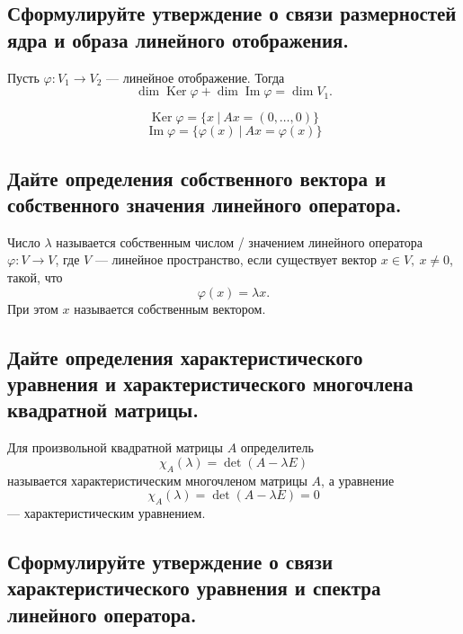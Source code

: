 \subsection{Сформулируйте утверждение о связи размерностей ядра и образа линейного отображения.}

\begin{theorem}
    Пусть $\varphi: V_1 \to V_2$ --- линейное отображение. Тогда
    \[
        \dim \operatorname{Ker}\varphi + \dim \operatorname{Im}\varphi = \dim V_1.
    \]
\end{theorem}

\begin{remark}
    \[
        \operatorname{Ker}\varphi =
        \{x\ |\ Ax = (0, \ldots, 0)\}
    \]
    \[
        \operatorname{Im}\varphi =
        \{\varphi(x)\ |\ Ax = \varphi(x)\}
    \]
\end{remark}

\subsection{Дайте определения собственного вектора и собственного значения линейного оператора.}

\begin{definition}
    Число $\lambda$ называется собственным числом / значением линейного оператора
    $\varphi: V \to V$, где $V$ --- линейное пространство, если существует вектор
    $x \in V,\ x \neq 0$, такой, что
    \[
        \varphi(x) = \lambda x.
    \]
    При этом $x$ называется собственным вектором.
\end{definition}

\subsection{Дайте определения характеристического уравнения и характеристического многочлена квадратной матрицы.}

\begin{definition}
    Для произвольной квадратной матрицы $A$ определитель
    \[
        \chi_A(\lambda) = \det(A - \lambda E)
    \]
    называется характеристическим многочленом матрицы $A$, а уравнение
    \[
        \chi_A(\lambda) = \det(A - \lambda E) = 0
    \]
    --- характеристическим уравнением.
\end{definition}

\subsection{Сформулируйте утверждение о связи характеристического уравнения и спектра линейного оператора.}

